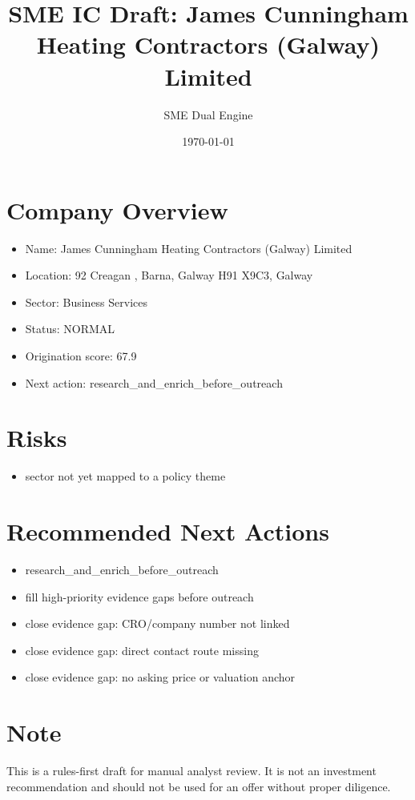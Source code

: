 \documentclass[11pt,a4paper]{article}
\title{SME IC Draft: James Cunningham Heating Contractors (Galway) Limited}
\author{SME Dual Engine}
\date{\today}
\begin{document}
\maketitle
\section*{Company Overview}
\begin{itemize}[leftmargin=1.4em]
\item Name: James Cunningham Heating Contractors (Galway) Limited
\item Location: 92 Creagan , Barna, Galway H91 X9C3, Galway
\item Sector: Business Services
\item Status: NORMAL
\item Origination score: 67.9
\item Next action: research\_and\_enrich\_before\_outreach
\end{itemize}
\section*{Risks}
\begin{itemize}[leftmargin=1.4em]
\item sector not yet mapped to a policy theme
\end{itemize}
\section*{Recommended Next Actions}
\begin{itemize}[leftmargin=1.4em]
\item research\_and\_enrich\_before\_outreach
\item fill high-priority evidence gaps before outreach
\item close evidence gap: CRO/company number not linked
\item close evidence gap: direct contact route missing
\item close evidence gap: no asking price or valuation anchor
\end{itemize}
\section*{Note}
This is a rules-first draft for manual analyst review. It is not an investment
recommendation and should not be used for an offer without proper diligence.
\end{document}

